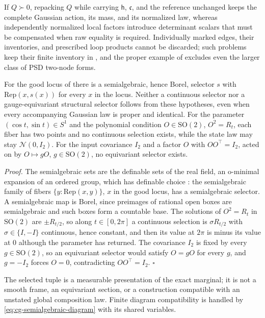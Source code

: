 If \(Q\succ0\), repacking \(Q\) while carrying \(\mathsf h\), \(\mathfrak c\), and
the reference unchanged keeps the complete Gaussian action, its mass, and its
normalized law, whereas independently normalized local factors introduce
determinant scalars that must be compensated when raw equality is required.
Individually marked edges, their inventories, and prescribed loop products
cannot be discarded; such problems keep their finite inventory in
, and the proper example of
 excludes even the larger class of
PSD two-node forms.

For the good locus of  there is
a semialgebraic, hence Borel, selector \(s\) with \(\mathrm{Rep}(x,s(x))\) for every
\(x\) in the locus. Neither a continuous selector nor a gauge-equivariant
structural selector follows from these hypotheses, even when every accompanying
Gaussian law is proper and identical. For the parameter
\((\cos t,\sin t)\in S^1\) and the polynomial condition \(O\in\mathrm{SO}(2)\),
\(O^2=R_t\), each fiber has two points and no continuous selection exists,
while the state law may stay \(\mathcal N(0,I_2)\). For the input covariance
\(I_2\) and a factor \(O\) with \(OO^\top=I_2\), acted on by
\(O\mapsto gO\), \(g\in\mathrm{SO}(2)\), no equivariant selector exists.

\noindent\emph{Proof.}
The semialgebraic sets are the definable sets of the real field, an o-minimal
expansion of an ordered group, which has definable choice \citep[Ch.~6, pp.~93--94]{vandenDries1998}: the
semialgebraic family of fibers \(\{y:\mathrm{Rep}(x,y)\}\), \(x\) in the good
locus, has a semialgebraic selector. A semialgebraic map is Borel, since
preimages of rational open boxes are semialgebraic and such boxes form a
countable base. The solutions of \(O^2=R_t\) in \(\mathrm{SO}(2)\) are
\(\pm R_{t/2}\), so along \(t\in[0,2\pi]\) a continuous selection is
\(\sigma R_{t/2}\) with \(\sigma\in\{I,-I\}\) continuous, hence constant, and
then its value at \(2\pi\) is minus its value at \(0\) although the parameter has
returned. The covariance \(I_2\) is fixed by every \(g\in\mathrm{SO}(2)\), so an
equivariant selector would satisfy \(O=gO\) for every \(g\), and \(g=-I_2\)
forces \(O=0\), contradicting \(OO^\top=I_2\). \(\square\)

The selected tuple is a measurable presentation of the exact marginal; it is not
a smooth frame, an equivariant section, or a construction compatible with an
unstated global composition law. Finite diagram compatibility is handled by
\eqref{eq:cg-semialgebraic-diagram} with its shared variables.

